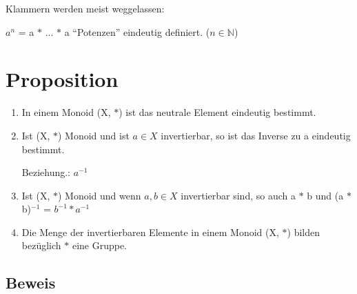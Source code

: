 \documentclass[a4paper, openany]{book}
\begin{document}
\par \medskip

Klammern werden meist weggelassen:

$a^n$ = a $\ast$ ... $\ast$ a  ``Potenzen'' eindeutig definiert. ($n \in \mathbb{N}$)

\section{Proposition}
\begin{enumerate}[label=(\alph*)]
  \item In einem Monoid (X, $\ast$) ist das neutrale Element eindeutig bestimmt.
  \item Ist (X, $\ast$) Monoid und ist $a \in X$ invertierbar, so ist das Inverse zu a eindeutig bestimmt.

  Beziehung.: $a^{-1}$
  \item Ist (X, $\ast$) Monoid und wenn $a,b \in X$ invertierbar sind, so auch a $\ast$ b und (a $\ast$ b)$^{-1}$ = $b^{-1} \ast a^{-1}$

  \item Die Menge der invertierbaren Elemente in einem Monoid (X, $\ast$) bilden bezüglich $\ast$ eine Gruppe.
\end{enumerate}

\subsection{Beweis}
\end{document}
